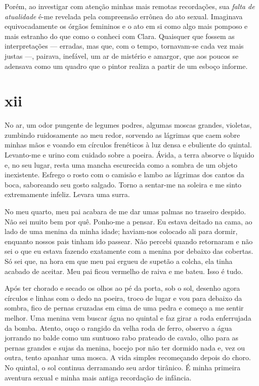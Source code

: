 Porém, ao investigar com atenção minhas mais remotas recordações, sua \textit
{falta de atualidade} é-me revelada pela compreensão errônea do ato sexual.
Imaginava equivocadamente os órgãos femininos e o ato em si como algo mais
pomposo e mais estranho do que como o conheci com Clara. Quaisquer que fossem
as interpretações --- erradas, mas que, com o tempo, tornavam-se cada vez
mais justas ---, pairava, inefável, um ar de mistério e amargor, que aos
poucos se adensava como um quadro que o pintor realiza a partir de um esboço
informe.


\section{xii} 

 

No ar, um odor pungente de legumes podres, algumas moscas grandes, violetas,
zumbindo ruidosamente ao meu redor, sorvendo as lágrimas que caem sobre
minhas mãos e voando em círculos frenéticos à luz densa e ebuliente do
quintal. Levanto-me e urino com cuidado sobre a poeira. Ávida, a terra
absorve o líquido e, no seu lugar, resta uma mancha escurecida como a sombra
de um objeto inexistente. Esfrego o rosto com o camisão e lambo as lágrimas
dos cantos da boca, saboreando seu gosto salgado. Torno a sentar-me na
soleira e me sinto extremamente infeliz. Levara uma surra.

No meu quarto, meu pai acabara de me dar umas palmas no traseiro despido. Não
sei muito bem por quê. Ponho-me a pensar. Eu estava deitado na cama, ao lado
de uma menina da minha idade; haviam-nos colocado ali para dormir, enquanto
nossos pais tinham ido passear. Não percebi quando retornaram e não sei o que
eu estava fazendo exatamente com a menina por debaixo das cobertas. Só sei
que, na hora em que meu pai ergueu de supetão a colcha, ela tinha acabado de
aceitar. Meu pai ficou vermelho de raiva e me bateu. Isso é tudo.

Após ter chorado e secado os olhos ao pé da porta, sob o sol, desenho agora
círculos e linhas com o dedo na poeira, troco de lugar e vou para debaixo da
sombra, fico de pernas cruzadas em cima de uma pedra e começo a me sentir
melhor. Uma menina vem buscar água no quintal e faz girar a roda enferrujada
da bomba. Atento, ouço o rangido da velha roda de ferro, observo a água
jorrando no balde como um suntuoso rabo prateado de cavalo, olho para as
pernas grandes e sujas da menina, bocejo por não ter dormido nada e, vez ou
outra, tento apanhar uma mosca. A vida simples recomeçando depois do choro.
No quintal, o sol continua derramando seu ardor tirânico. É minha primeira
aventura sexual e minha mais antiga recordação de infância.

